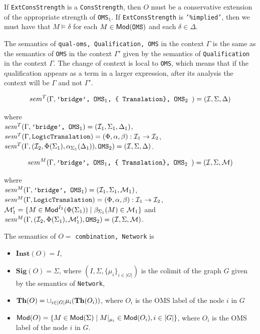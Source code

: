 \documentclass[10pt,fleqn,%
\ifpretendfinal
final%
\else
draft%
\fi,
]{scrreprt}
\newcommand*{\syntax}[1]{\texttt{#1}}
\newcommand{\Sig}{\mathbf{Sig}}
\newcommand{\Inst}{\ensuremath{\mathbf{Inst}}}
\begin{document}
If \syntax{ExtConsStrength} is a \syntax{ConsStrength}, then $O$ must be a conservative extension
of the appropriate strength of \syntax{OMS}$_1$.
If \syntax{ExtConsStrength} is \syntax{'\%implied'}, then
we must have that $M\models \delta$
for each $M\in \Mod(\syntax{OMS})$ and each
$\delta \in \Delta$.

 
The semantics of \syntax{qual-oms, Qualification, OMS}
in the context $\Gamma$ is the same as the
semantics of \syntax{OMS} in the context
$\Gamma'$ given by the semantics of
\syntax{Qualification} in the context $\Gamma$.
The change of context is local to \syntax{OMS}, which
means that if the qualification appears as a term in 
a larger expression, after its analysis the context will
be $\Gamma$ and not $\Gamma'$.


$$sem^T(\Gamma, \syntax{'bridge', OMS$_1$, \{ Translation\}, OMS$_2$ })= (\cI, \Sigma,\Delta)$$

where \\
$sem^T(\Gamma,  \syntax{'bridge', OMS$_1$})= (\cI_1, \Sigma_1,\Delta_1)$,\\
$sem^T(\Gamma,  \syntax{LogicTranslation}) = (\Phi, \alpha,\beta) : \cI_1 \to \cI_2$,\\
$sem^T(\Gamma,  (\cI_2, \Phi(\Sigma_1), \alpha_{\Sigma_1}(\Delta_1)), \syntax{OMS}_2) = (\cI, \Sigma,\Delta)$. 


$$sem^M(\Gamma, \syntax{'bridge', OMS$_1$, \{ Translation\}, OMS$_2$ })= (\cI, \Sigma,\cM)$$

where \\
$sem^M(\Gamma,  \syntax{'bridge', OMS$_1$})= (\cI_1, \Sigma_1,\cM_1)$,\\
$sem^M(\Gamma, \syntax{LogicTranslation}) = (\Phi, \alpha,\beta) : \cI_1 \to \cI_2$,\\
${\cal M}'_1 = \{ M \in \mathsf{Mod}^{I_2}(\Phi(\Sigma_1)) \mid \beta_{\Sigma_1}(M) \in {\cal M}_1 \}$ and \\
$sem^M(\Gamma, (\cI_2, \Phi(\Sigma_1), \cM'_1), \syntax{OMS}_2) = (\cI,\Sigma,\cM)$.



The semantics of 
$O=$ \syntax{combination, Network} is
\begin{itemize}
  \item $\Inst(O) = I$,
  \item $\Sig(O) = \Sigma$, where $(I,\Sigma,  \{\mu_i\}_{i\in |G|})$ is the colimit of the graph $G$ given by the semantics of \syntax{Network},
  \item $\mathbf{Th}(O) = \cup_{i\in |G|} \mu_i(\mathbf{Th}(O_i))$, where $O_i$ is the OMS label of the node $i$ in $G$
  \item $\mathsf{Mod}(O) =  \{ M\in\mathsf{Mod}(\Sigma) \mid M|_{\mu_i} \in \mathsf{Mod}(O_i), i\in |G| \}$, where $O_i$ is the OMS label of the node $i$ in $G$.
\end{itemize}
\end{document}
